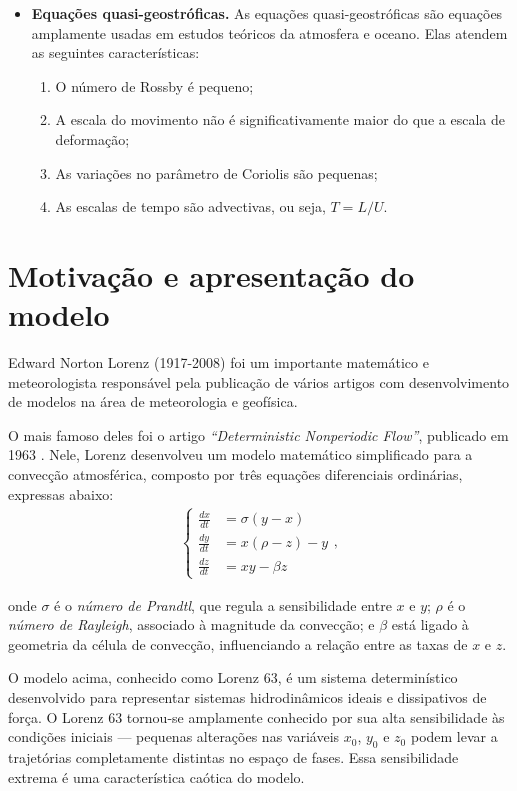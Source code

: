 \begin{itemize}
	\item \textbf{Equações quasi-geostróficas.} As equações quasi-geostróficas são equações  amplamente usadas em estudos teóricos da atmosfera e oceano. Elas atendem as seguintes características:
	      \begin{enumerate}
	      	\item O número de Rossby é pequeno;
	      	\item A escala do movimento não é significativamente maior do que a escala de deformação;
	      	\item As variações no parâmetro de Coriolis são pequenas;
	      	\item As escalas de tempo são advectivas, ou seja, $T=L/U$.
	      \end{enumerate}
\end{itemize}



\section{Motivação e apresentação do modelo} \label{sec:ch01_apresentacao_do_modelo}

Edward Norton Lorenz (1917-2008) foi um importante matemático e meteorologista responsável pela publicação de vários artigos com desenvolvimento de modelos na área de meteorologia e geofísica.

O mais famoso deles foi o artigo \textit{``Deterministic Nonperiodic Flow''}, publicado em 1963 \citet{Lorenz1963}. Nele, Lorenz desenvolveu um modelo matemático simplificado para a convecção atmosférica, composto por três equações diferenciais ordinárias, expressas abaixo:
\begin{align}
    \begin{cases}
        \frac{dx}{dt} & = \sigma(y-x)     \\
        \frac{dy}{dt} & = x(\rho - z) - y \\
        \frac{dz}{dt} & = xy - \beta z
    \end{cases},
    \label{eq:ch01-lorenz63}
\end{align}

onde $\sigma$ é o \textit{número de Prandtl}, que regula a sensibilidade entre $x$ e $y$; $\rho$ é o \textit{número de Rayleigh}, associado à magnitude da convecção; e $\beta$ está ligado à geometria da célula de convecção, influenciando a relação entre as taxas de $x$ e $z$.
    
O modelo acima, conhecido como Lorenz 63, é um sistema determinístico desenvolvido para representar sistemas hidrodinâmicos ideais e dissipativos de força. O Lorenz 63 tornou-se amplamente conhecido por sua alta sensibilidade às condições iniciais — pequenas alterações nas variáveis $x_0$, $y_0$ e $z_0$ podem levar a trajetórias completamente distintas no espaço de fases. Essa sensibilidade extrema é uma característica caótica do modelo.

